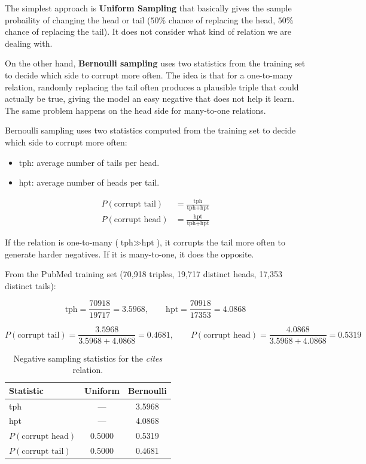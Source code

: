 \documentclass{article}
\begin{document}
  The simplest approach is \textbf{Uniform Sampling} that basically gives the sample probaility of changing the head or tail ($50\%$ chance of
  replacing the head, $50\%$ chance of replacing the tail). It does not
  consider what kind of relation we are dealing with.
  
On the other hand, \textbf{Bernoulli sampling} uses two statistics from the training set to decide
  which side to corrupt more often. The idea is that for a one-to-many
  relation, randomly replacing the tail often produces a plausible triple
  that could actually be true, giving the model an easy negative that
  does not help it learn. The same problem happens on the head side for
  many-to-one relations.
  
 Bernoulli sampling uses two statistics computed from the training set to decide
  which side to corrupt more often:

  \begin{itemize}
    \item $\text{tph}$: average number of tails per head.
    \item $\text{hpt}$: average number of heads per tail.
  \end{itemize}

  \begin{align}
    P(\text{corrupt tail}) &= \frac{\text{tph}}{\text{tph} + \text{hpt}} \\[4pt]
    P(\text{corrupt head}) &= \frac{\text{hpt}}{\text{tph} + \text{hpt}}
  \end{align}

  If the relation is one-to-many ($\text{tph} \gg \text{hpt}$), it corrupts
  the tail more often to generate harder negatives. If it is many-to-one,
  it does the opposite.

  From the PubMed training set (70{,}918 triples, 19{,}717 distinct heads,
  17{,}353 distinct tails):

  \[
    \text{tph} = \frac{70918}{19717} = 3.5968, \qquad
    \text{hpt} = \frac{70918}{17353} = 4.0868
  \]

  \[
    P(\text{corrupt tail}) = \frac{3.5968}{3.5968 + 4.0868} = 0.4681, \qquad
    P(\text{corrupt head}) = \frac{4.0868}{3.5968 + 4.0868} = 0.5319
  \]

  \begin{table}[h]
  \centering
  \begin{tabular}{lcc}
  \hline
  \textbf{Statistic} & \textbf{Uniform} & \textbf{Bernoulli} \\
  \hline
  tph & --- & 3.5968 \\
  hpt & --- & 4.0868 \\
  $P(\text{corrupt head})$ & 0.5000 & 0.5319 \\
  $P(\text{corrupt tail})$ & 0.5000 & 0.4681 \\
  \hline
  \end{tabular}
  \caption{Negative sampling statistics for the \textit{cites} relation.}
  \label{tab:a4}
  \end{table}
\end{document}
